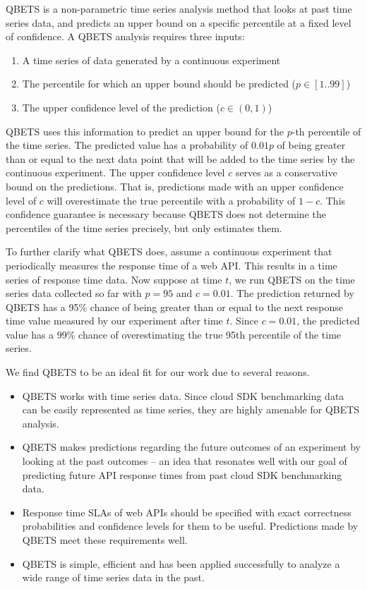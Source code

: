 QBETS is a non-parametric time series analysis method that looks at past time series data, and predicts
an upper bound on a specific percentile at a fixed level of confidence. A QBETS analysis requires three inputs:

\begin{enumerate}
\item A time series of data generated by a continuous experiment
\item The percentile for which an upper bound should be predicted ($p \in [1..99]$)
\item The upper confidence level of the prediction ($c \in (0,1)$)
\end{enumerate}

QBETS uses this information to predict an upper bound for the $p$-th percentile of the time series.
The predicted value has a probability of $0.01p$ of being greater than or equal to the next data point that
will be added to the time series by the continuous experiment. 
The upper confidence level $c$ serves as a conservative
bound on the predictions. That is, predictions made with an upper confidence level of $c$ will overestimate
the true percentile with a probability of $1-c$. This confidence guarantee is necessary because 
QBETS does not determine the 
percentiles of the time series precisely, but only estimates them. 

To further clarify what QBETS does, assume a continuous experiment that periodically measures the
response time of a web API. This results in a time series of response time data. Now suppose at time $t$,
we run QBETS on the time series data collected so far with $p=95$ and $c=0.01$. The prediction returned
by QBETS has a 95\% chance of being greater than or equal to the next response time value measured
by our experiment after time $t$. Since $c=0.01$, the predicted value has a 99\% chance of
overestimating the true 95th percentile of the time series.

We find QBETS to be an ideal fit for our work due to several reasons. 
\begin{itemize}
\item QBETS works with time series data. Since
cloud SDK benchmarking data can be easily represented as time series,
they are highly amenable for QBETS analysis. 
\item QBETS makes predictions regarding the
future outcomes of an experiment by looking at the past outcomes -- an idea that resonates well with our
goal of predicting future API response times from past cloud SDK benchmarking data. 
\item Response time
SLAs of web APIs should be specified with exact correctness probabilities and confidence levels for
them to be useful. Predictions made by QBETS meet these requirements well. 
\item QBETS is 
simple, efficient and has been applied successfully to analyze a wide range of time series data in the past.
\end{itemize}

